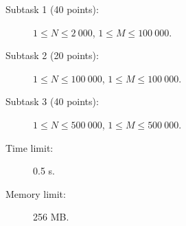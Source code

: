 \documentclass{boi2014}
\begin{document}
    \Scoring

    \begin{description}
        \item[Subtask 1 (40 points):] $1 \le N \le 2\ 000$, $1 \le M \le 100\ 000$.
        \item[Subtask 2 (20 points):] $1 \le N \le 100\ 000$, $1 \le M \le 100\ 000$.
        \item[Subtask 3 (40 points):] $1 \le N \le 500\ 000$, $1 \le M \le 500\ 000$.
    \end{description}

    \Constraints

    \begin{description}
        \item[Time limit:] 0.5 s.
        \item[Memory limit:] 256 MB.
    \end{description}
\end{document}
